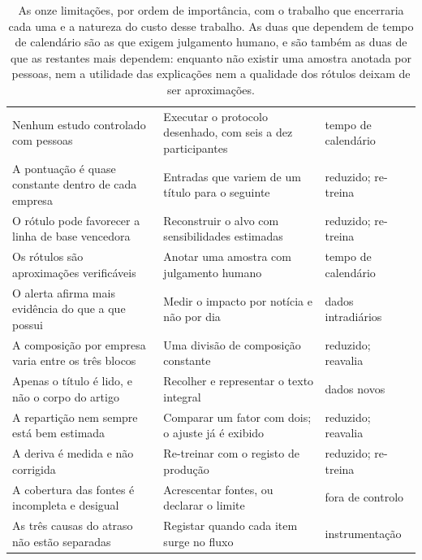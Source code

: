 \begin{table}[!htbp]
\caption[As limitações e o trabalho que as encerraria]{As onze limitações, por ordem de
importância, com o trabalho que encerraria cada uma e a natureza do custo desse trabalho. As duas
que dependem de tempo de calendário são as que exigem julgamento humano, e são também as duas de
que as restantes mais dependem: enquanto não existir uma amostra anotada por pessoas, nem a
utilidade das explicações nem a qualidade dos rótulos deixam de ser aproximações.}
\label{tab:con_limites}
\centering
\footnotesize
\begin{tabular}{@{}L{0.33\textwidth} L{0.32\textwidth} L{0.20\textwidth}@{}}
\toprule
{} &  &  \\
\midrule
Nenhum estudo controlado com pessoas & Executar o protocolo desenhado, com seis a dez participantes &
tempo de calendário \\
A pontuação é quase constante dentro de cada empresa & Entradas que variem de um título para o
seguinte & reduzido; re-treina \\
O rótulo pode favorecer a linha de base vencedora & Reconstruir o alvo com sensibilidades
estimadas & reduzido; re-treina \\
Os rótulos são aproximações verificáveis & Anotar uma amostra com julgamento humano &
tempo de calendário \\
O alerta afirma mais evidência do que a que possui & Medir o impacto por notícia e não por dia &
dados intradiários \\
A composição por empresa varia entre os três blocos & Uma divisão de composição constante & reduzido; reavalia \\
Apenas o título é lido, e não o corpo do artigo & Recolher e representar o texto integral &
dados novos \\
A repartição nem sempre está bem estimada & Comparar um fator com dois; o ajuste já é exibido & reduzido; reavalia \\
A deriva é medida e não corrigida & Re-treinar com o registo de produção & reduzido; re-treina \\
A cobertura das fontes é incompleta e desigual & Acrescentar fontes, ou declarar o limite &
fora de controlo \\
As três causas do atraso não estão separadas & Registar quando cada item surge no fluxo &
instrumentação \\
\bottomrule
\end{tabular}
\end{table}

